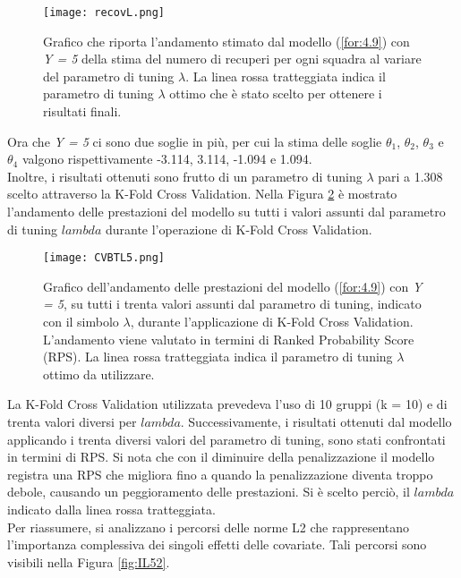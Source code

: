 \begin{figure}[htbp]
	\begin{center}
		\texttt{[image: recovL.png]}
		\caption{Grafico che riporta l'andamento stimato dal modello (\ref{for:4.9}) con \emph{Y = 5} della stima del numero di recuperi per ogni squadra al variare del parametro di tuning $\lambda$. La linea rossa tratteggiata indica il parametro di tuning $\lambda$ ottimo che è stato scelto per ottenere i risultati finali.} \label{fig:recovL5}
	\end{center}
\end{figure}
Ora che \emph{Y = 5} ci sono due soglie in più, per cui la stima delle soglie $\theta_1$, $\theta_2$, $\theta_3$ e $\theta_4$ valgono rispettivamente -3.114, 3.114, -1.094 e 1.094.\\
Inoltre, i risultati ottenuti sono frutto di un parametro di tuning $\lambda$ pari a 1.308 scelto attraverso la  K-Fold Cross Validation. Nella Figura \ref{fig:lambda3} è mostrato l'andamento delle prestazioni del modello su tutti i valori assunti dal parametro di tuning $lambda$ durante l'operazione di K-Fold Cross Validation.
\begin{figure}[htbp]
	\begin{center}
		\texttt{[image: CVBTL5.png]}
		\caption{Grafico dell'andamento delle prestazioni del modello (\ref{for:4.9}) con \emph{Y = 5}, su tutti i trenta valori assunti dal parametro di tuning, indicato con il simbolo $\lambda$, durante l'applicazione di K-Fold Cross Validation. L'andamento viene valutato in termini di Ranked Probability Score (RPS). La linea rossa tratteggiata indica il parametro di tuning $\lambda$ ottimo da utilizzare.} \label{fig:lambda3}
	\end{center}
\end{figure}
La K-Fold Cross Validation utilizzata prevedeva l'uso di 10 gruppi (k = 10) e di trenta valori diversi per $lambda$. Successivamente, i risultati ottenuti dal modello applicando i trenta diversi valori del parametro di tuning, sono stati confrontati in termini di RPS. Si nota che con il diminuire della penalizzazione il modello registra una RPS che migliora fino a quando la penalizzazione diventa troppo debole, causando un peggioramento delle prestazioni. Si è scelto perciò, il $lambda$ indicato dalla linea rossa tratteggiata.\\
Per riassumere, si analizzano i percorsi delle norme L2 che rappresentano l'importanza complessiva dei singoli effetti delle covariate. Tali percorsi sono visibili nella Figura \ref{fig:IL52}.
